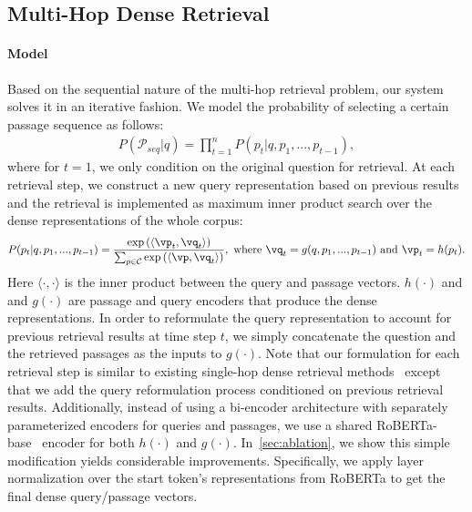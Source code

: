 \subsection{Multi-Hop Dense Retrieval} 
\label{sec:model}

\paragraph{Model} Based on the sequential nature of the multi-hop retrieval problem, our system solves it in an iterative fashion. We model the probability of selecting a certain passage sequence as follows:
\begin{align*}
    P(\mathcal{P}_{seq}|q) = \prod_{t=1}^{n} P(p_t|q,p_1, ..., p_{t-1}),
\end{align*}
where for $t=1$, we only condition on the original question for retrieval. At each retrieval step, we construct a new query representation based on previous results and the retrieval is implemented as maximum inner product search over the dense representations of the whole corpus:
\begin{align*}
    P(p_t|q,p_1, ..., p_{t-1}) = \frac{\exp{(\langle \vp_t, \vq_t \rangle})}{\sum_{p \in \mathcal{C}} \exp{(\langle \vp, \vq_t \rangle)}},  \textrm{ where } \vq_t = g(q, p_1, ..., p_{t-1}) \textrm{ and } \vp_t = h(p_t).
\end{align*}
Here $\langle\cdot,\cdot\rangle$ is the inner product between the query and passage vectors. $h(\cdot)$ and and $g(\cdot)$ are passage and query encoders that produce the dense representations. In order to reformulate the query representation to account for previous retrieval results at time step $t$, 
we simply concatenate the question and the retrieved passages as the inputs to $g(\cdot)$. Note that our formulation for each retrieval step is similar to existing single-hop dense retrieval methods~\citep{ORQA,REALM,DPR} except that we add the query reformulation process conditioned on previous retrieval results. Additionally, instead of using a bi-encoder architecture with separately parameterized encoders for queries and passages, we use a shared  RoBERTa-base~\citep{RoBERTa} encoder for both $h(\cdot)$ and $g(\cdot)$. In~\cref{sec:ablation}, we show this simple modification yields considerable improvements.
Specifically, we apply layer normalization over the start token's representations from RoBERTa to get the final dense query/passage vectors. 

